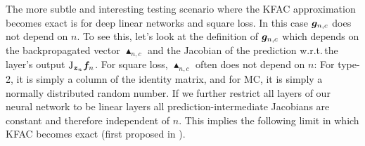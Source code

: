 The more subtle and interesting testing scenario where the KFAC approximation becomes exact is for deep linear networks and square loss.
In this case ${\bm{g}}_{n,c}$ does not depend on $n$.
To see this, let's look at the definition of ${\bm{g}}_{n,c}$ which depends on the backpropagated vector $\blacktriangle_{n,c}$ and the Jacobian of the prediction w.r.t.\,the layer's output $\mathrm{J}_{{\bm{z}}_n} {\bm{f}}_n$.
For square loss, $\blacktriangle_{n,c}$ often does not depend on $n$: For type-2, it is simply a column of the identity matrix, and for MC, it is simply a normally distributed random number.
If we further restrict all layers of our neural network to be linear layers all prediction-intermediate Jacobians are constant and therefore independent of $n$.
This implies the following limit in which KFAC becomes exact (first proposed in \cite{bernacchia2018exact}).

